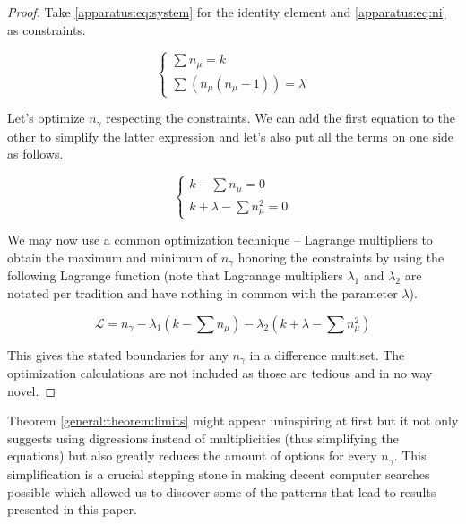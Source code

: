     \begin{proof}
        Take \eqref{apparatus:eq:system} for the identity element and \eqref{apparatus:eq:ni} as constraints.
        
        \begin{equation}
            \begin{cases}
                \sum {n_\mu} = k \\
                \sum (n_\mu(n_\mu-1)) = \lambda
            \end{cases}
        \end{equation}
        
        Let's optimize $n_\gamma$ respecting the constraints. We can add the first equation to the other to simplify the latter expression and let's also put all the terms on one side as follows.
        
        \begin{equation}
            \begin{cases}
                k - \sum {n_\mu} = 0 \\
                k + \lambda - \sum n_\mu^2 = 0
            \end{cases}
        \end{equation}
        
        We may now use a common optimization technique -- Lagrange multipliers to obtain the maximum and minimum of $n_\gamma$ honoring the constraints by using the following Lagrange function (note that Lagranage multipliers $\lambda_1$ and $\lambda_2$ are notated per tradition and have nothing in common with the parameter $\lambda$).
        
        \begin{equation}
            \mathcal L = n_\gamma - \lambda_1 (k - \sum n_\mu) - \lambda_2 (k + \lambda - \sum n_\mu^2)
        \end{equation}
        
        This gives the stated boundaries for any $n_\gamma$ in a difference multiset. The optimization calculations are not included as those are tedious and in no way novel.
    \end{proof}

    Theorem \ref{general:theorem:limits} might appear uninspiring at first but it not only suggests using digressions instead of multiplicities (thus simplifying the equations) but also greatly reduces the amount of options for every $n_\gamma$. This simplification is a crucial stepping stone in making decent computer searches possible which allowed us to discover some of the patterns that lead to results presented in this paper.
        
